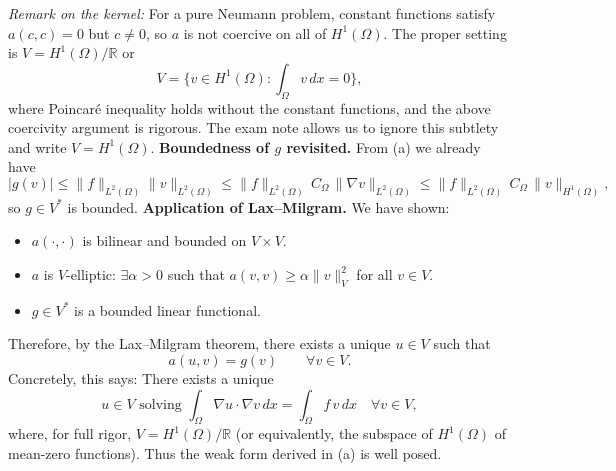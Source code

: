 \emph{Remark on the kernel:}
For a pure Neumann problem, constant functions satisfy $a(c,c) = 0$ but $c\neq 0$, so $a$ is not coercive on all of $H^1(\Omega)$.
The proper setting is $V = H^1(\Omega)/\mathbb{R}$ or
\[
  V = \bigl\{ v\in H^1(\Omega) : \int_\Omega v\,dx = 0\bigr\},
\]
where Poincaré inequality holds without the constant functions, and the above coercivity argument is rigorous.
The exam note allows us to ignore this subtlety and write $V=H^1(\Omega)$.
\textbf{Boundedness of $g$ revisited.}
From (a) we already have
\[
  |g(v)| \le \|f\|_{L^2(\Omega)}\|v\|_{L^2(\Omega)}
  \le \|f\|_{L^2(\Omega)}\,C_\Omega\,\|\nabla v\|_{L^2(\Omega)}
  \le \|f\|_{L^2(\Omega)}\,C_\Omega\,\|v\|_{H^1(\Omega)},
\]
so $g\in V^\ast$ is bounded.
\textbf{Application of Lax--Milgram.}
We have shown:
\begin{itemize}
  \item $a(\cdot,\cdot)$ is bilinear and bounded on $V\times V$.
  \item $a$ is $V$-elliptic: $\exists \alpha>0$ such that $a(v,v)\ge\alpha\|v\|_V^2$ for all $v\in V$.
  \item $g\in V^\ast$ is a bounded linear functional.
\end{itemize}
Therefore, by the Lax--Milgram theorem, there exists a unique $u\in V$ such that
\[
  a(u,v) = g(v) \qquad \forall v\in V.
\]
Concretely, this says:
There exists a unique
\[
  \boxed{
    u \in V \text{ solving }
    \int_\Omega \nabla u \cdot \nabla v\,dx = \int_\Omega f\,v\,dx
    \quad\forall v\in V,
  }
\]
where, for full rigor, $V = H^1(\Omega)/\mathbb{R}$ (or equivalently, the subspace of $H^1(\Omega)$ of mean-zero functions).
Thus the weak form derived in (a) is well posed.
